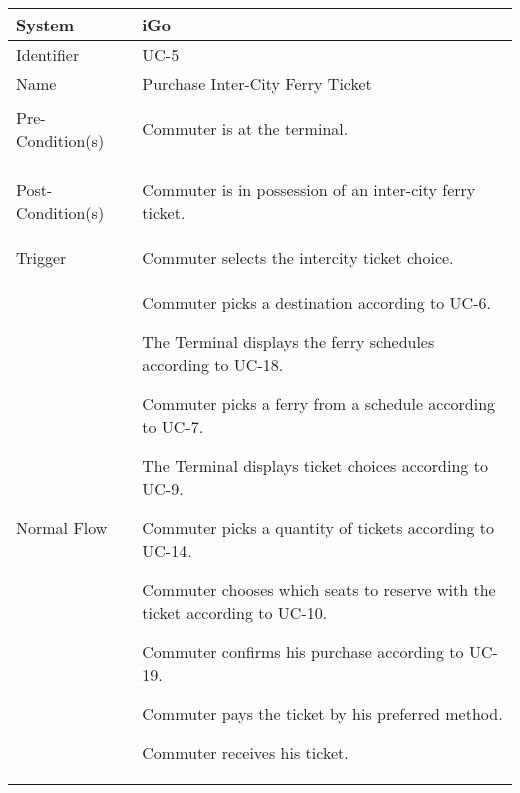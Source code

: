 \begin{table}[ht]
    \centering
    \begin{tabular}{|l|p{11cm}|}
         \hline
         System             & iGo\\
         \hline
         Identifier         & UC-5 \\
         \hline
         Name               & Purchase Inter-City Ferry Ticket \\
         \hline
         Pre-Condition(s)   & 
         \begin{enumerate*}[itemjoin=\newline]
             \item Commuter is at the terminal.
         \end{enumerate*} \\
         \hline
         Post-Condition(s)  & 
         \begin{enumerate*}[itemjoin=\newline]
            \item Commuter is in possession of an inter-city ferry ticket. 
         \end{enumerate*} \\
         \hline
         Trigger            & Commuter selects the intercity ticket choice. \\
         \hline
         Normal Flow        & 
         \begin{enumerate*}[itemjoin=\newline]
            \item Commuter picks a destination according to UC-6.
            \item The Terminal displays the ferry schedules according to UC-18.
            \item Commuter picks a ferry from a schedule according to UC-7.
            \item The Terminal displays ticket choices according to UC-9.
            \item Commuter picks a quantity of tickets according to UC-14.
            \item Commuter chooses which seats to reserve with the ticket according to UC-10.
            \item Commuter confirms his purchase according to UC-19.
            \item Commuter pays the ticket by his preferred method.
            \item Commuter receives his ticket.
         \end{enumerate*} \\

\end{tabular}
\end{table}
